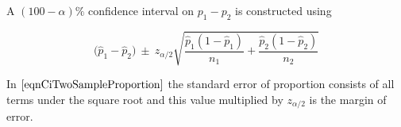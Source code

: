\begin{ci}\label{ciTwoSampleProportion}
A $(100 - \alpha)\%$ confidence interval on 
$p_{1} - p_{2}$ 
is constructed using

\begin{equation}\label{eqnCiTwoSampleProportion}
\big(\hat{p}_{1}	- \hat{p}_{2}\big)	~\pm~		z_{\alpha / 2}  
\sqrt{ \frac{ \hat{p}_{1} (1 - \hat{p}_{1}) }{ n_{1}}		+	\frac{ \hat{p}_{2} (1 - \hat{p}_{2}) }{ n_{2}} }
\end{equation}

\end{ci}




In $\ref{eqnCiTwoSampleProportion}$
the standard error of proportion 
consists of all terms under the square root
and this value multiplied by $z_{\alpha/2}$
is the margin of error.



